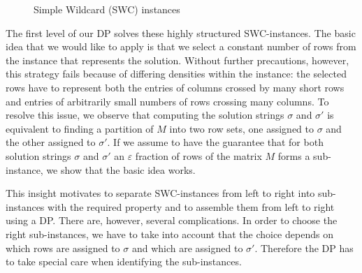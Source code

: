 \begin{figure}[h]
    \begin{center}
        \caption{\label{fig:swc} Simple Wildcard (SWC) instances}
    \end{center}
\end{figure}

The first level of our DP solves these highly structured SWC-instances.
The basic idea that we would like to apply is that we select a constant number of rows from the instance that represents the solution.
Without further precautions, however, this strategy fails because of differing densities within the instance: 
the selected rows have to represent both the entries of columns crossed by many short rows and entries of arbitrarily small numbers of rows crossing many columns.
To resolve this issue, we observe that computing the solution strings $\sigma$ and $\sigma'$ is equivalent to finding a partition of $M$ into two row sets, one assigned to $\sigma$ and the other assigned to $\sigma'$.
If we assume to have the guarantee that for both solution strings $\sigma$ and $\sigma'$ an $\varepsilon$ fraction of rows of the matrix $M$ forms a \BMEC sub-instance, we show that the basic idea works.

This insight motivates to separate SWC-instances from left to right into sub-instances with the required property and to assemble them from left to right using a DP.
There are, however, several complications.
In order to choose the right sub-instances, we have to take into account that the choice depends on which rows are assigned to $\sigma$ and which are assigned to $\sigma'$.
Therefore the DP has to take special care when identifying the sub-instances.


